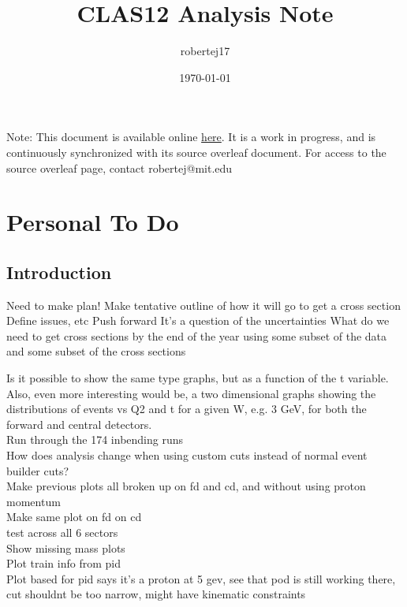 \documentclass[oneside]{book}
\title{CLAS12 \DVEP Analysis Note}
\author{robertej17 }
\date{\today}
\begin{document}
\maketitle
Note: This document is available online \href{http://www.lns.mit.edu/\~robertej/CLAS12/Clas12DVPiPAnaNote.pdf}{here}. It is a work in progress, and is continuously synchronized with its source overleaf document. For access to the source overleaf page, contact robertej@mit.edu



\chapter{Personal To Do}

\section{Introduction}
Need to make plan!
Make tentative outline of how it will go to get a cross section
Define issues, etc
Push forward
It’s a question of the uncertainties 
What do we need to get cross sections by the end of the year using some subset of the data and some subset of the cross sections

Is it possible to show the same type graphs, but as a function of the t variable. Also, even more interesting would be, a two dimensional graphs  showing the distributions of events vs Q2 and t  for a given W, e.g. 3 GeV, for both the forward and central detectors.\\

Run through the 174 inbending runs\\

How does analysis change when using custom cuts instead of normal event builder cuts?\\


Make previous plots all broken up on fd and cd, and without using proton momentum\\

Make same plot on fd on cd \\
test across all 6 sectors\\
Show missing mass plots\\
Plot train info from pid\\

Plot based for pid says it's a proton at 5 gev, see that pod is still working there, cut shouldnt be too narrow, might have kinematic constraints\\
\end{document}
